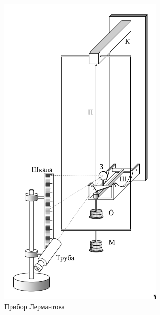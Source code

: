 \documentclass[a4paper, 12pt]{article}
\begin{document}
\begin{figure}
    \centering
    \includegraphics[width=\linewidth]{lermantov.png}
	\caption{Прибор Лермантова}
    \label{pic:lermantov}
\end{figure}
\end{document}
